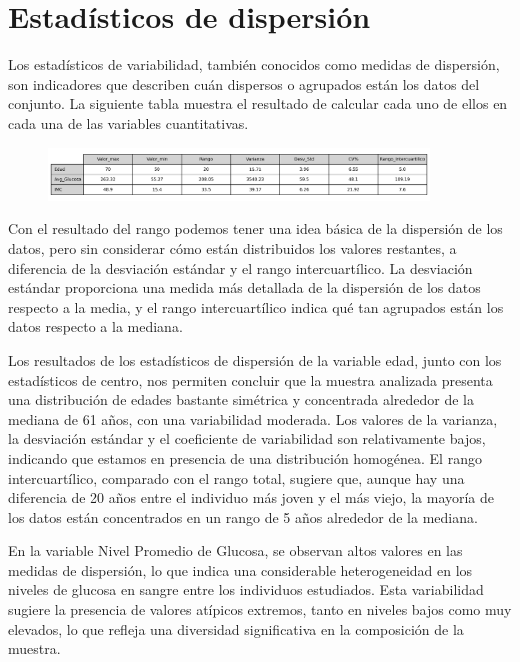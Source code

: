 \documentclass[a4paper, 12pt]{article}
\begin{document}
\newpage
\section{Estadísticos de dispersión}
Los estadísticos de variabilidad, también conocidos como medidas de dispersión, son
indicadores que describen cuán dispersos o agrupados están los datos del conjunto. La siguiente tabla muestra el resultado de calcular cada uno de ellos en cada una de
las variables cuantitativas.

\begin{figure}[H]
    \centering
    \includegraphics[width=0.9\textwidth]{img/Tablas/Estadísticos_de_dispersión.png}
\end{figure}

Con el resultado del rango podemos tener una idea básica de la dispersión de los datos, pero sin considerar cómo están 
distribuidos los valores restantes, a diferencia de la desviación estándar y el rango intercuartílico. La desviación estándar 
proporciona una medida más detallada de la dispersión de los datos respecto a la media, y el rango intercuartílico indica qué 
tan agrupados están los datos respecto a la mediana.

Los resultados de los estadísticos de dispersión de la variable edad, junto con los estadísticos de centro, nos permiten 
concluir que la muestra analizada presenta una distribución de edades bastante simétrica y concentrada alrededor de la mediana 
de 61 años, con una variabilidad moderada. Los valores de la varianza, la desviación estándar y el coeficiente de variabilidad 
son relativamente bajos, indicando que estamos en presencia de una distribución homogénea. El rango intercuartílico, comparado con el rango total, sugiere que, aunque hay una diferencia de 20 
años entre el individuo más joven y el más viejo, la mayoría de los datos están concentrados en un rango de 5 años alrededor 
de la mediana.

En la variable Nivel Promedio de Glucosa, se observan altos valores en las medidas de dispersión, lo que indica una considerable 
heterogeneidad en los niveles de glucosa en sangre entre los individuos estudiados. Esta variabilidad sugiere la presencia de 
valores atípicos extremos, tanto en niveles bajos como muy elevados, lo que refleja una diversidad significativa en la composición 
de la muestra.
\end{document}
